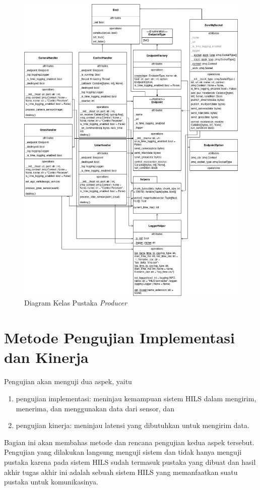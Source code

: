 \begin{figure}[h!]
	\centering
	\includegraphics[width=1.0\textwidth]{resources/chapter-4/producer-class_diagram.png}
	\caption{Diagram Kelas Pustaka \textit{Producer}}
	\label{chapter-4-producer-class-diagram}
\end{figure}

\section{Metode Pengujian Implementasi dan Kinerja}

Pengujian akan menguji dua aspek, yaitu
\begin{enumerate}
	\item pengujian implementasi: meninjau kemampuan sistem HILS dalam mengirim,
	      menerima, dan menggunakan data dari sensor, dan
	\item pengujian kinerja: meninjau latensi yang dibutuhkan untuk mengirim
	      data.
\end{enumerate}
Bagian ini akan membahas metode dan rencana pengujian kedua aspek tersebut.
Pengujian yang dilakukan langsung menguji sistem dan tidak hanya menguji pustaka
karena pada sistem HILS sudah termasuk pustaka yang dibuat dan hasil akhir
tugas akhir ini adalah sebuah sistem HILS yang memanfaatkan suatu pustaka untuk
komunikasinya.

